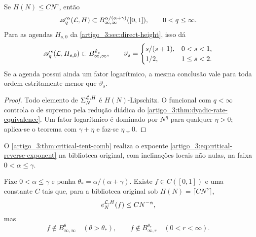 \begin{corollary}\label{map:artigo_3:5.8}
\label{artigo_3:cor:raw-library-inverse}
Se $H(N)\le C N^\gamma$, então
\begin{equation}
 \mathscr A_q^\alpha(\mathcal{L},H)
 \subset B^{\alpha/(\alpha+\gamma)}_{\infty,\infty}([0,1]),
 \qquad 0<q\le\infty.
 \label{artigo_3:eq:raw-library-inverse}
\end{equation}
Para as agendas $H_{s,0}$ da \cref{artigo_3:sec:direct-height}, isso dá
\begin{equation}
 \mathscr A_q^s(\mathcal{L},H_{s,0})
 \subset B^{\vartheta_s}_{\infty,\infty},
 \qquad
 \vartheta_s=
 \begin{cases}
 s/(s+1),&0<s<1,\\
 1/2,&1\le s<2.
 \end{cases}
 \label{artigo_3:eq:corrected-schedule-raw-inverse}
\end{equation}
Se a agenda possui ainda um fator logarítmico, a mesma conclusão vale para
toda ordem estritamente menor que $\vartheta_s$.
\end{corollary}

\begin{proof}
Todo elemento de $\Sigma_N^{\mathcal{L},H}$ é $H(N)$-Lipschitz. O funcional com
$q<\infty$ controla o de supremo pela redução diádica do
\cref{artigo_3:thm:dyadic-rate-equivalence}. Um fator logarítmico é dominado por
$N^\eta$ para qualquer $\eta>0$; aplica-se o teorema com
$\gamma+\eta$ e faz-se $\eta\downarrow0$.
\end{proof}

O \cref{artigo_3:thm:critical-tent-comb} realiza o expoente \eqref{artigo_3:eq:critical-reverse-exponent} na biblioteca original, com inclinações locais não nulas, na faixa $0<\alpha\le\gamma$.

\begin{theorem}\label{map:artigo_3:5.9}
\label{artigo_3:thm:critical-tent-comb}
Fixe $0<\alpha\le\gamma$ e ponha
$\theta_*=\alpha/(\alpha+\gamma)$. Existe
$f\in C([0,1])$ e uma constante $C$ tais que, para a biblioteca original sob
$H(N)=\lceil CN^\gamma\rceil$,
\begin{equation}
 e_N^{\mathcal{L},H}(f)\le CN^{-\alpha},
 \label{artigo_3:eq:comb-approximation-rate}
\end{equation}
mas
\begin{equation}
 f\notin B^\theta_{\infty,\infty}\quad(\theta>\theta_*),
 \qquad
 f\notin B^{\theta_*}_{\infty,r}\quad(0<r<\infty).
 \label{artigo_3:eq:comb-sharpness}
\end{equation}
\end{theorem}

